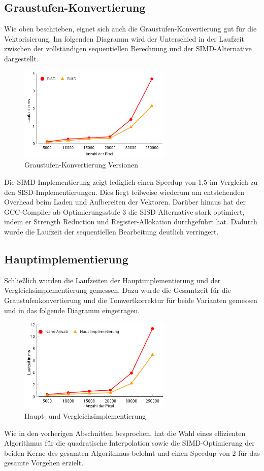 \documentclass[course=erap]{aspdoc}
\begin{document}
\subsection*{Graustufen-Konvertierung}
Wie oben beschrieben, eignet sich auch die Graustufen-Konvertierung gut für die Vektorisierung. Im folgenden Diagramm wird der Unterschied in der Laufzeit zwischen der vollständigen sequentiellen Berechnung und der SIMD-Alternative dargestellt.
\begin{figure}[H]
  \centering
  \includegraphics[width=0.65\textwidth]{graySDMD.png}
  \caption{Graustufen-Konvertierung Versionen} 
  \label{fig:graysimd}
\end{figure}
Die SIMD-Implementierung zeigt lediglich einen Speedup von 1,5 im Vergleich zu den SISD-Implementierungen. Dies liegt teilweise wiederum am entstehenden Overhead beim Laden und Aufbereiten der Vektoren. Darüber hinaus hat der GCC-Compiler ab Optimierungsstufe 3 die SISD-Alternative stark optimiert, indem er Strength Reduction und Register-Allokation durchgeführt hat. Dadurch wurde die Laufzeit der sequentiellen Bearbeitung deutlich verringert.

\subsection{Hauptimplementierung}
Schließlich wurden die Laufzeiten der Hauptimplementierung und der Vergleichsimplementierung gemessen. Dazu wurde die Gesamtzeit für die Graustufenkonvertierung und die Tonwertkorrektur für beide Varianten gemessen und in das folgende Diagramm eingetragen.
\begin{figure}[H]
  \centering
  \includegraphics[width=0.65\textwidth]{mainComp.png}
  \caption{Haupt- und Vergleichsimplementierung} 
  \label{fig:mainComp}
\end{figure}
Wie in den vorherigen Abschnitten besprochen, hat die Wahl eines effizienten Algorithmus für die quadratische Interpolation sowie die SIMD-Optimierung der beiden Kerne des gesamten Algorithmus belohnt und einen Speedup von 2 für das gesamte Vorgehen erzielt.
\end{document}
